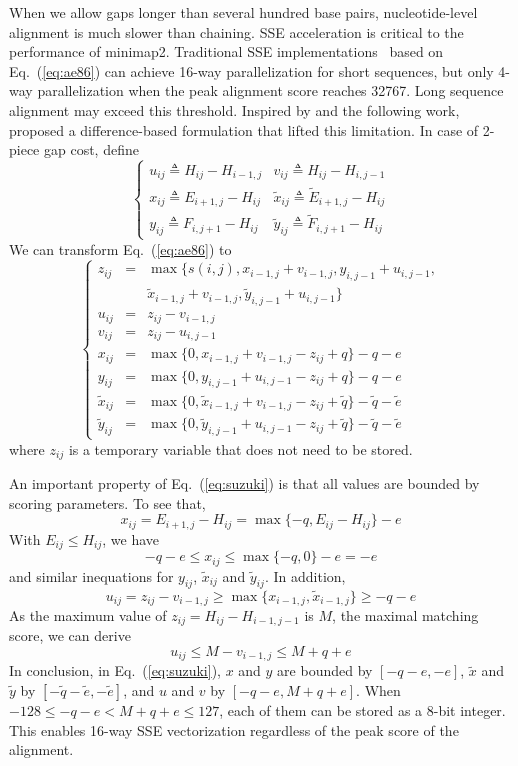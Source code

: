 \documentclass{bioinfo}
\begin{document}
\begin{methods}
When we allow gaps longer than several hundred base pairs, nucleotide-level
alignment is much slower than chaining. SSE acceleration is critical to the
performance of minimap2. Traditional SSE implementations~\citep{Farrar:2007hs}
based on Eq.~(\ref{eq:ae86}) can achieve 16-way parallelization for short
sequences, but only 4-way parallelization when the peak alignment score reaches
32767. Long sequence alignment may exceed this threshold. Inspired by
\citet{Wu:1996aa} and the following work, \citet{Suzuki130633} proposed a
difference-based formulation that lifted this limitation.
In case of 2-piece gap cost, define
\[
\left\{\begin{array}{ll}
u_{ij}\triangleq H_{ij}-H_{i-1,j} & v_{ij}\triangleq H_{ij}-H_{i,j-1} \\
x_{ij}\triangleq E_{i+1,j}-H_{ij} & \tilde{x}_{ij}\triangleq \tilde{E}_{i+1,j}-H_{ij} \\
y_{ij}\triangleq F_{i,j+1}-H_{ij} & \tilde{y}_{ij}\triangleq \tilde{F}_{i,j+1}-H_{ij}
\end{array}\right.
\]
We can transform Eq.~(\ref{eq:ae86}) to
\begin{equation}\label{eq:suzuki}
\left\{\begin{array}{lll}
z_{ij}&=&\max\{s(i,j),x_{i-1,j}+v_{i-1,j},y_{i,j-1}+u_{i,j-1},\\
&&\tilde{x}_{i-1,j}+v_{i-1,j},\tilde{y}_{i,j-1}+u_{i,j-1}\}\\
u_{ij}&=&z_{ij}-v_{i-1,j}\\
v_{ij}&=&z_{ij}-u_{i,j-1}\\
x_{ij}&=&\max\{0,x_{i-1,j}+v_{i-1,j}-z_{ij}+q\}-q-e\\
y_{ij}&=&\max\{0,y_{i,j-1}+u_{i,j-1}-z_{ij}+q\}-q-e\\
\tilde{x}_{ij}&=&\max\{0,\tilde{x}_{i-1,j}+v_{i-1,j}-z_{ij}+\tilde{q}\}-\tilde{q}-\tilde{e}\\
\tilde{y}_{ij}&=&\max\{0,\tilde{y}_{i,j-1}+u_{i,j-1}-z_{ij}+\tilde{q}\}-\tilde{q}-\tilde{e}
\end{array}\right.
\end{equation}
where $z_{ij}$ is a temporary variable that does not need to be stored.

An important property of Eq.~(\ref{eq:suzuki}) is that all values are bounded
by scoring parameters. To see that,
\[
x_{ij}=E_{i+1,j}-H_{ij}=\max\{-q,E_{ij}-H_{ij}\}-e
\]
With $E_{ij}\le H_{ij}$, we have
\[
-q-e\le x_{ij}\le\max\{-q,0\}-e=-e
\]
and similar inequations for $y_{ij}$, $\tilde{x}_{ij}$ and $\tilde{y}_{ij}$.
In addition,
\[
u_{ij}=z_{ij}-v_{i-1,j}\ge\max\{x_{i-1,j},\tilde{x}_{i-1,j}\}\ge-q-e
\]
As the maximum value of $z_{ij}=H_{ij}-H_{i-1,j-1}$ is $M$, the maximal
matching score, we can derive
\[
u_{ij}\le M-v_{i-1,j}\le M+q+e
\]
In conclusion, in Eq.~(\ref{eq:suzuki}), $x$ and $y$ are bounded by $[-q-e,-e]$,
$\tilde{x}$ and $\tilde{y}$ by $[-\tilde{q}-\tilde{e},-\tilde{e}]$, and $u$ and
$v$ by $[-q-e,M+q+e]$. When $-128\le-q-e<M+q+e\le127$, each of them can be stored as
a 8-bit integer. This enables 16-way SSE vectorization regardless of the peak
score of the alignment.


\end{methods}
\end{document}
